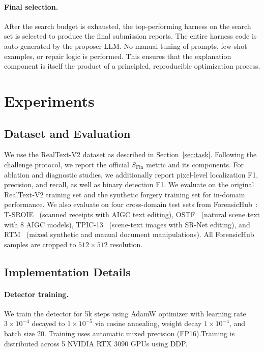 \documentclass[sigconf, screen, review, anonymous]{acmart}
\begin{document}
\paragraph{Final selection.} After the search budget is exhausted, the top-performing harness on the search set is selected to produce the final submission reports. The entire harness code is auto-generated by the proposer LLM. No manual tuning of prompts, few-shot examples, or repair logic is performed. This ensures that the explanation component is itself the product of a principled, reproducible optimization process.

\section{Experiments}
\label{sec:experiments}

\subsection{Dataset and Evaluation}

We use the RealText-V2 dataset as described in Section~\ref{sec:task}. Following the challenge protocol, we report the official $S_{\text{Fin}}$ metric and its components. For ablation and diagnostic studies, we additionally report pixel-level localization F1, precision, and recall, as well as binary detection F1. We evaluate on the original RealText-V2 training set and the synthetic forgery training set for in-domain performance. We also evaluate on four cross-domain test sets from ForensicHub~\cite{du2025forensichub}: T-SROIE~\cite{wang2022tampered} (scanned receipts with AIGC text editing), OSTF~\cite{qu2025revisiting} (natural scene text with 8 AIGC models), TPIC-13~\cite{wang2022detecting} (scene-text images with SR-Net editing), and RTM~\cite{luo2025toward} (mixed synthetic and manual document manipulations). All ForensicHub samples are cropped to $512 \times 512$ resolution.

\subsection{Implementation Details}

\paragraph{Detector training.} We train the detector for 5k steps using AdamW optimizer with learning rate $3 \times 10^{-4}$ decayed to $1 \times 10^{-5}$ via cosine annealing, weight decay $1 \times 10^{-4}$, and batch size 20. Training uses automatic mixed precision (FP16).Training is distributed across 5 NVIDIA RTX 3090 GPUs using DDP.
\end{document}
